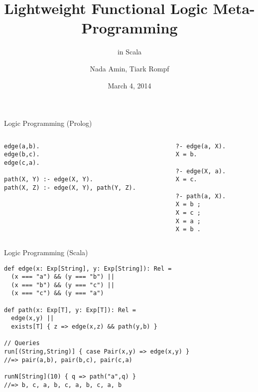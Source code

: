 \documentclass{beamer}
\title{Lightweight Functional Logic Meta-Programming}
\subtitle{in Scala}
\author{Nada Amin, Tiark Rompf}
\institute{LAMP, EPFL}
\date{March 4, 2014}
\begin{document}
\frame{\titlepage}

\begin{frame}[fragile]{Logic Programming (Prolog)}
\begin{columns}
\begin{column}[t]{8cm}
\begin{verbatim}
edge(a,b).
edge(b,c).
edge(c,a).

path(X, Y) :- edge(X, Y).
path(X, Z) :- edge(X, Y), path(Y, Z).
\end{verbatim}
\end{column}
\begin{column}[t]{4cm}
\begin{verbatim}
?- edge(a, X).
X = b.

?- edge(X, a).
X = c.

?- path(a, X).
X = b ;
X = c ;
X = a ;
X = b .
\end{verbatim}
\end{column}
\end{columns}
\end{frame}

\begin{frame}[fragile]{Logic Programming (Scala)}
\begin{verbatim}
def edge(x: Exp[String], y: Exp[String]): Rel =
  (x === "a") && (y === "b") ||
  (x === "b") && (y === "c") ||
  (x === "c") && (y === "a")

def path(x: Exp[T], y: Exp[T]): Rel =
  edge(x,y) ||
  exists[T] { z => edge(x,z) && path(y,b) }

// Queries
run[(String,String)] { case Pair(x,y) => edge(x,y) }
//=> pair(a,b), pair(b,c), pair(c,a)

runN[String](10) { q => path("a",q) }
//=> b, c, a, b, c, a, b, c, a, b
\end{verbatim}
\end{frame}
\end{document}

